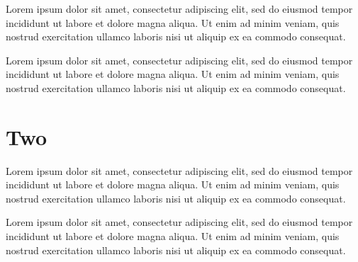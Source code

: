 \documentclass[oneside,12pt]{book}
\begin{document}
Lorem ipsum dolor sit amet, consectetur adipiscing elit, sed do eiusmod tempor incididunt ut labore et dolore magna aliqua. Ut enim ad minim veniam, quis nostrud exercitation ullamco laboris nisi ut aliquip ex ea commodo consequat.

Lorem ipsum dolor sit amet, consectetur adipiscing elit, sed do eiusmod tempor incididunt ut labore et dolore magna aliqua. Ut enim ad minim veniam, quis nostrud exercitation ullamco laboris nisi ut aliquip ex ea commodo consequat.

\chapter{Two}
Lorem ipsum dolor sit amet, consectetur adipiscing elit, sed do eiusmod tempor incididunt ut labore et dolore magna aliqua. Ut enim ad minim veniam, quis nostrud exercitation ullamco laboris nisi ut aliquip ex ea commodo consequat.

Lorem ipsum dolor sit amet, consectetur adipiscing elit, sed do eiusmod tempor incididunt ut labore et dolore magna aliqua. Ut enim ad minim veniam, quis nostrud exercitation ullamco laboris nisi ut aliquip ex ea commodo consequat.
\end{document}
